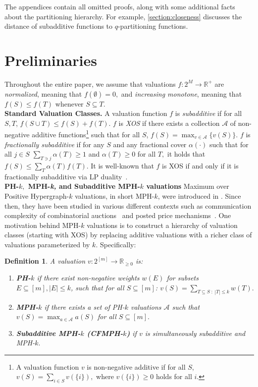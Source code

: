 \documentclass[11pt]{article}%
\newtheorem{definition}[theorem]{Definition}
\numberwithin{theorem}{subsection}
\def\hmath$#1${\texorpdfstring{{\rmfamily\textit{#1}}}{#1}}
\begin{document}
The appendices contain all omitted proofs, along with some additional facts about the partitioning hierarchy. For example, \cref{section:closeness} discusses the distance of subadditive functions to $q$-partitioning functions.

\section{Preliminaries}\label{sec:prelim}
Throughout the entire paper, we assume that valuations
$f:2^M\longrightarrow \mathbb{R}^+$ are \textit{normalized}, meaning that $f(\emptyset) = 0,$ and \textit{increasing monotone}, meaning that $f(S)\le f(T)$ whenever $S\subseteq T.$\\

\noindent\textbf{Standard Valuation Classes.} A valuation function $f$ is \emph{subadditive} if for all $S,T$, $f(S \cup T) \leq f(S) + f(T)$. $f$ is \emph{XOS} if there exists a collection $\mathcal{A}$ of non-negative additive functions\footnote{A valuation function $v$ is non-negative additive if for all $S$, $v(S)=\sum_{ i \in S} v(\{i\}),$ where $v(\{i\})\geq 0$ holds for all $i.$} such that for all $S$, $f(S)=\max_{v\in \mathcal{A}}\{v(S)\}$. $f$ is \emph{fractionally subadditive} if for any $S$ and any fractional cover $\alpha(\cdot)$ such that for all $j \in S$ $\sum_{T\ni j} \alpha(T) \geq 1$ and $\alpha(T)\geq 0$ for all $T,$ it holds that $f(S) \leq \sum_{T} \alpha(T) f(T)$. It is well-known that $f$ is XOS if and only if it is fractionally subadditive via LP duality~\cite{Feige09}. \\



\noindent\textbf{PH-$k,$ MPH-\hmath$k,$ and Subadditive MPH-$k$ valuations}
Maximum over Positive Hypergraph-$k$ valuations, in short MPH-$k$, were introduced in \cite{FeigeFIILS15}. Since then, they have been studied in various different contexts such as communication complexity of combinatorial auctions~\cite{EzraFNTW19} and posted price mechanisms~\cite{FeldmanGL15}. One motivation behind MPH-$k$ valuations is to construct a hierarchy of valuation classes (starting with XOS) by replacing additive valuations with a richer class of valuations parameterized by $k$. Specifically:

\begin{definition}
A valuation $v:2^{[m]}\longrightarrow \mathbb{R}_{\ge 0}$ is:
\begin{enumerate}
    \item \textbf{PH-$k$} if there exist non-negative weights $w(E)$ for subsets $E\subseteq [m], |E| \leq k$, such that for all $S\subseteq [m]$: $\displaystyle v(S) = \sum_{T\subseteq S\; : \; |T|\le k} w(T).$
    \item \textbf{MPH-$k$} if there exists a set of PH-$k$ valuations $\mathcal{A}$ such that $\displaystyle v(S) = \max_{a\in \mathcal{A}} a(S)$ for all $S\subseteq[m].$
    \item \textbf{Subadditive MPH-$k$ (CFMPH-$k$)} if $v$ is simultaneously subadditive and MPH-$k.$ 
\end{enumerate}
\end{definition}
\end{document}
